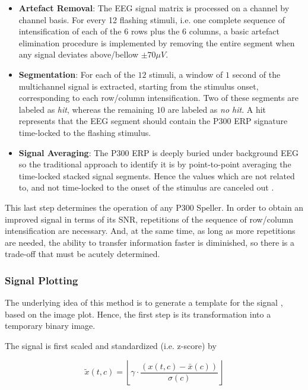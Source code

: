 \documentclass[entropy,article,submit,moreauthors,pdftex,10pt,a4paper]{mdpi}
\begin{document}
\begin{itemize}
\item \textbf{Artefact Removal}: The EEG signal matrix is processed on a channel by channel basis.   For every 12 flashing stimuli, i.e. one complete sequence of intensification of each of the $6$ rows plus the $6$ columns, a basic artefact elimination procedure is implemented by removing the entire segment when any signal deviates above/bellow $ \pm 70 \mu V $.
\item \textbf{Segmentation}: For each of the $12$ stimuli,  a window of $1$ second of the multichannel signal is extracted, starting from the stimulus onset, corresponding to each row/column intensification.  Two of these segments are labeled as \textit{hit}, whereas the remaining $10$ are labeled as \textit{no hit}.  A hit represents that the EEG segment should contain the P300 ERP signature time-locked to the flashing stimulus. 
\item \textbf{Signal Averaging}:  The P300 ERP is deeply buried under background EEG so the traditional approach to identify it is by point-to-point averaging the time-locked stacked signal segments.  Hence the values which are not related to, and not time-locked to the onset of the stimulus are canceled out \citep{Liang2008}. 
\end{itemize}

This last step determines the operation of any P300 Speller.  In order to obtain an improved signal in terms of its SNR, repetitions of the sequence of row/column intensification are necessary.  And, at the same time, as long as more repetitions are needed, the ability to transfer information faster is diminished, so there is a trade-off that must be acutely determined.

\subsubsection{Signal Plotting} \label{Plot}

The underlying idea of this method is to generate a template for the signal \citep{Ramele2016},  based on the image plot.  Hence, the first step is its transformation into a temporary binary image.

The signal is first scaled and standardized (i.e. z-score) by 

\begin{equation}
\tilde{x}(t,c) = \left \lfloor{ \gamma \cdot \frac{( x(t,c) - \bar{x}(c)  )}{ \sigma(c) } }\right \rfloor
\end{equation}
\end{document}
